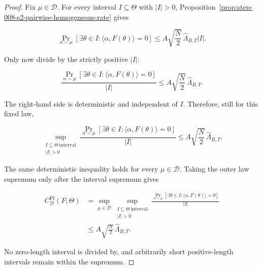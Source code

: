 \begin{proof}
Fix \(\mu\in\mathcal D\). For every interval \(I\subseteq\Theta\) with
\(\lvert I\rvert>0\), Proposition~\ref{prop:step-008-s2-pairwise-homogeneous-rate} gives

\begin{equation}
\label{eq:appendix-display-243}
\Pr_{\alpha\sim\mu}
[\exists\theta\in I:\langle\alpha,F(\theta)\rangle=0]
\leq
A\sqrt{\frac N2}\,
\widehat\Lambda_{B,T}\lvert I\rvert.
\end{equation}

Only now divide by the strictly positive \(\lvert I\rvert\):

\begin{equation}
\label{eq:appendix-display-244}
\frac{
\Pr_{\alpha\sim\mu}
[\exists\theta\in I:\langle\alpha,F(\theta)\rangle=0]
}{\lvert I\rvert}
\leq
A\sqrt{\frac N2}\,\widehat\Lambda_{B,T}.
\end{equation}

The right-hand side is deterministic and independent of \(I\). Therefore, still for this fixed law,

\begin{equation}
\label{eq:appendix-display-245}
\sup_{\substack{I\subseteq\Theta\ \mathrm{interval}\\ \lvert I\rvert>0}}
\frac{
\Pr_{\alpha\sim\mu}
[\exists\theta\in I:\langle\alpha,F(\theta)\rangle=0]
}{\lvert I\rvert}
\leq
A\sqrt{\frac N2}\,\widehat\Lambda_{B,T}.
\end{equation}

The same deterministic inequality holds for every \(\mu\in\mathcal D\). Taking the outer law supremum only
after the interval supremum gives

\begin{equation}
\label{eq:appendix-display-246}
\begin{aligned}
C^{\mathrm{Pf}}_{\mathcal D}(F;\Theta)
&=
\sup_{\mu\in\mathcal D}
\sup_{\substack{I\subseteq\Theta\ \mathrm{interval}\\ \lvert I\rvert>0}}
\frac{
\Pr_{\alpha\sim\mu}
[\exists\theta\in I:\langle\alpha,F(\theta)\rangle=0]
}{\lvert I\rvert}\\
&\leq
A\sqrt{\frac N2}\,\widehat\Lambda_{B,T}.
\end{aligned}
\end{equation}

No zero-length interval is divided by, and arbitrarily short positive-length intervals remain within the
supremum. 
\end{proof}


